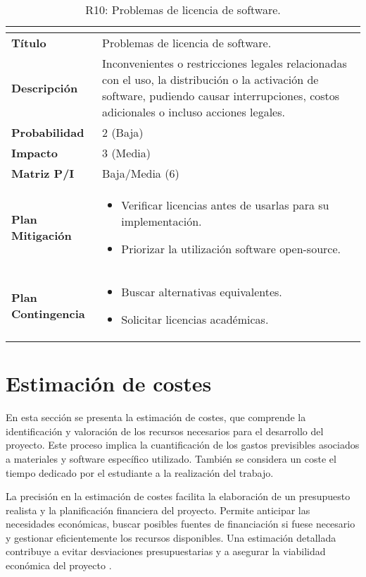 \begin{table}[H]
\centering
\begin{tabular}{|>{\bfseries}l|p{10cm}|}
\hline
\rowcolor{lightgray}
\multicolumn{2}{|c|}{\textbf{Riesgo R09}} \\ \hline
Título & Problemas de licencia de software.\\ \hline
Descripción & Inconvenientes o restricciones legales relacionadas con el uso, la distribución o la activación de software, pudiendo causar interrupciones, costos adicionales o incluso acciones legales. \\ \hline
Probabilidad & 2 (Baja) \cellcolor{greenrisk} \\ \hline
Impacto & 3 (Media)  \cellcolor{yellowrisk}\\ \hline
Matriz P/I & Baja/Media (6)\\ \hline
Plan Mitigación & 
\begin{itemize}
\item Verificar licencias antes de usarlas para su implementación.
\item Priorizar la utilización software open-source.
\end{itemize} \\ \hline
Plan Contingencia & 
\begin{itemize}
\item Buscar alternativas equivalentes.
\item Solicitar licencias académicas.
\end{itemize} \\ \hline
\end{tabular}
\caption{R10: Problemas de licencia de software.}
\label{tab:R09}
\end{table}


\section{Estimación de costes}
En esta sección se presenta la estimación de costes, que comprende la identificación y valoración de los recursos necesarios para el desarrollo del proyecto. Este proceso implica la cuantificación de los gastos previsibles asociados a materiales y software específico utilizado. También se considera un coste el tiempo dedicado por el estudiante a la realización del trabajo.

La precisión en la estimación de costes facilita la elaboración de un presupuesto realista y la planificación financiera del proyecto. Permite anticipar las necesidades económicas, buscar posibles fuentes de financiación si fuese necesario y gestionar eficientemente los recursos disponibles. Una estimación detallada contribuye a evitar desviaciones presupuestarias y a asegurar la viabilidad económica del proyecto \cite{oliveros2011gestion}.

